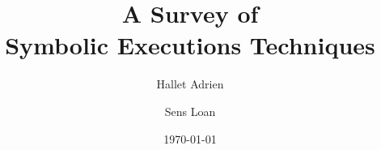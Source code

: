 \documentclass[11pt]{article}
\begin{document}
\title{A Survey of\\Symbolic Executions Techniques} %
\author{Hallet Adrien \and Sens Loan}
\date{\today}
\maketitle

  \nocite{*}

{}

\end{document}
